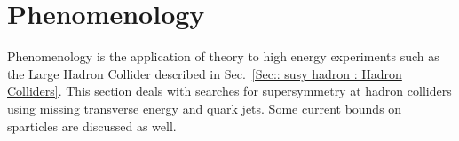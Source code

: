 \documentclass[twoside,english]{uiofysmaster}
\begin{document}
{\section{Phenomenology}

Phenomenology is the application of theory to high energy experiments such as the Large Hadron Collider described in Sec.~\ref{Sec:: susy hadron : Hadron Colliders}. This section deals with searches for supersymmetry at hadron colliders using missing transverse energy and quark jets. Some current bounds on sparticles are discussed as well.

}
\end{document}
